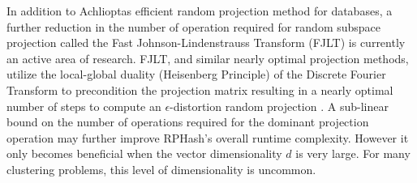 In addition to Achlioptas efficient random projection method for databases, a further reduction in the number of
operation required for random subspace projection called the Fast Johnson-Lindenstrauss Transform (FJLT)
\cite{ailon2006,Dasgupta,ailon2013} is currently an active area of research.  FJLT, and similar nearly optimal
projection methods, utilize the local-global duality (Heisenberg Principle) of the Discrete Fourier Transform to
precondition the projection matrix resulting in a nearly optimal number of steps to compute an $\epsilon$-distortion
random projection \cite{ailon2006,Dasgupta,ailon2013}.  A sub-linear bound on the number of operations required for the
dominant projection operation may further improve \textsf{RPHash}'s overall runtime complexity.  However it only becomes
beneficial when the vector dimensionality $d$ is very large.  For many clustering problems, this level of dimensionality is 
uncommon.





